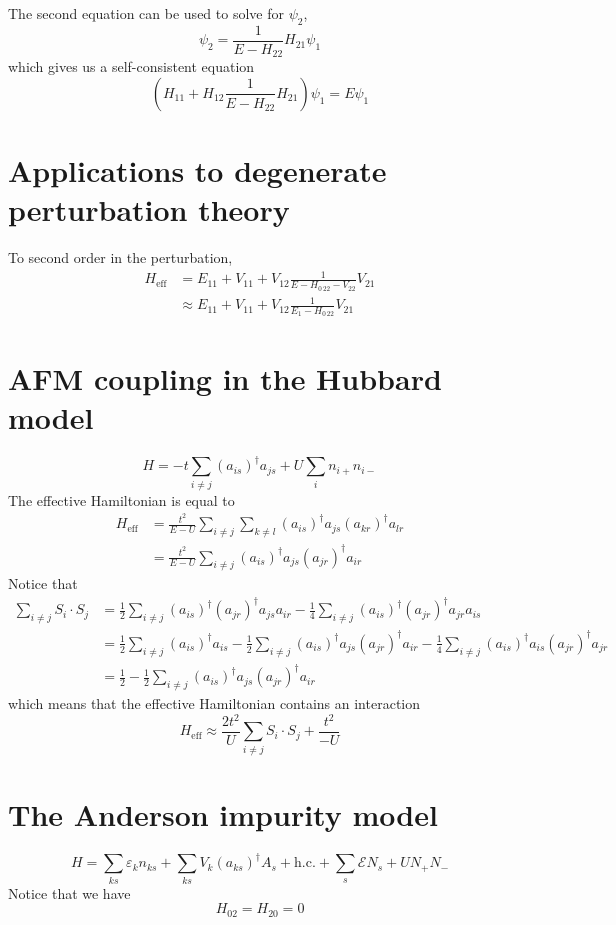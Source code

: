 \documentclass[12pt, oneside]{book}
\begin{document}
The second equation can be used to solve for $\psi_2$,
\[
\psi_2=\frac1{E-H_{22}}H_{21}\psi_1
\]
which gives us a self-consistent equation
\[
\left(H_{11}+H_{12}\frac1{E-H_{22}}H_{21}\right)\psi_1=E\psi_1
\]

\section*{Applications to degenerate perturbation theory}
To second order in the perturbation,
\begin{align*}
H_{\text{eff}}
&=E_11+V_{11}+V_{12}\frac1{E-H_{0\,22}-V_{22}}V_{21}\\
&\approx E_11+V_{11}+V_{12}\frac1{E_1-H_{0\,22}}V_{21}
\end{align*}

\section*{AFM coupling in the Hubbard model}
\[
H=-t\sum_{i\ne j}(a_{is})^{\dagger}a_{js}+U\sum_in_{i+}n_{i-}
\]
The effective Hamiltonian is equal to
\begin{align*}
H_{\text{eff}}
&=\frac{t^2}{E-U}\sum_{i\ne j}\sum_{k\ne l}(a_{is})^{\dagger}a_{js}(a_{kr})^{\dagger}a_{lr}\\
&=\frac{t^2}{E-U}\sum_{i\ne j}(a_{is})^{\dagger}a_{js}(a_{jr})^{\dagger}a_{ir}
\end{align*}
Notice that
\begin{align*}
\sum_{i\ne j}S_i\cdot S_j
&=\frac12\sum_{i\ne j}(a_{is})^{\dagger}(a_{jr})^{\dagger}a_{js}a_{ir}-\frac14\sum_{i\ne j}(a_{is})^{\dagger}(a_{jr})^{\dagger}a_{jr}a_{is}\\
&=\frac12\sum_{i\ne j}(a_{is})^{\dagger}a_{is}-\frac12\sum_{i\ne j}(a_{is})^{\dagger}a_{js}(a_{jr})^{\dagger}a_{ir}-\frac14\sum_{i\ne j}(a_{is})^{\dagger}a_{is}(a_{jr})^{\dagger}a_{jr}\\
&=\frac12-\frac12\sum_{i\ne j}(a_{is})^{\dagger}a_{js}(a_{jr})^{\dagger}a_{ir}
\end{align*}
which means that the effective Hamiltonian contains an interaction
\[
H_{\text{eff}}\approx\frac{2t^2}{U}\sum_{i\ne j}S_i\cdot S_j+\frac{t^2}{-U}
\]

\section*{The Anderson impurity model}
\[
H=\sum_{ks}\varepsilon_kn_{ks}+\sum_{ks}V_k(a_{ks})^{\dagger}A_s+\text{h.c.}+\sum_s\mathcal{E}N_s+UN_+N_-
\]
Notice that we have
\[
H_{02}=H_{20}=0
\]
\end{document}
